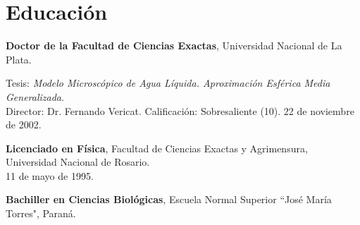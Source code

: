\section*{Educación}

 \textbf{Doctor de la Facultad de Ciencias Exactas}, Universidad Nacional de La Plata.

Tesis: \emph{Modelo Microscópico de Agua Líquida. Aproximación Esférica Media Generalizada}. \\Director: Dr. Fernando Vericat. Calificación: Sobresaliente  (10). 22 de noviembre de 2002.

 \textbf{Licenciado en Física}, Facultad de Ciencias Exactas y Agrimensura, Universidad Nacional de Rosario. \\11 de mayo de 1995.

 \textbf{Bachiller en Ciencias Biológicas}, Escuela Normal Superior ``José María Torres", Paraná.
